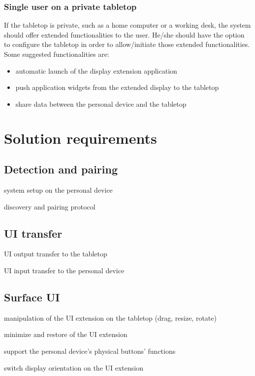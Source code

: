 \subsubsection{Single user on a private tabletop}

If the tabletop is private, such as a home computer or a working desk, the system should offer extended functionalities to the user.
He/she should have the option to configure the tabletop in order to allow/initiate those extended functionalities.
Some suggested functionalities are:
\begin{itemize}
\item automatic launch of the display extension application
\item push application widgets from the extended display to the tabletop
\item share data between the personal device and the tabletop
\end{itemize}

\section{Solution requirements}

\subsection{Detection and pairing}



 system setup on the personal device

 discovery and pairing protocol

\subsection{UI transfer}

 UI output transfer to the tabletop

 UI input transfer to the personal device

\subsection{Surface UI}

 manipulation of the UI extension on the tabletop (drag, resize, rotate)

 minimize and restore of the UI extension

 support the personal device's physical buttons' functions

 switch display orientation on the UI extension


